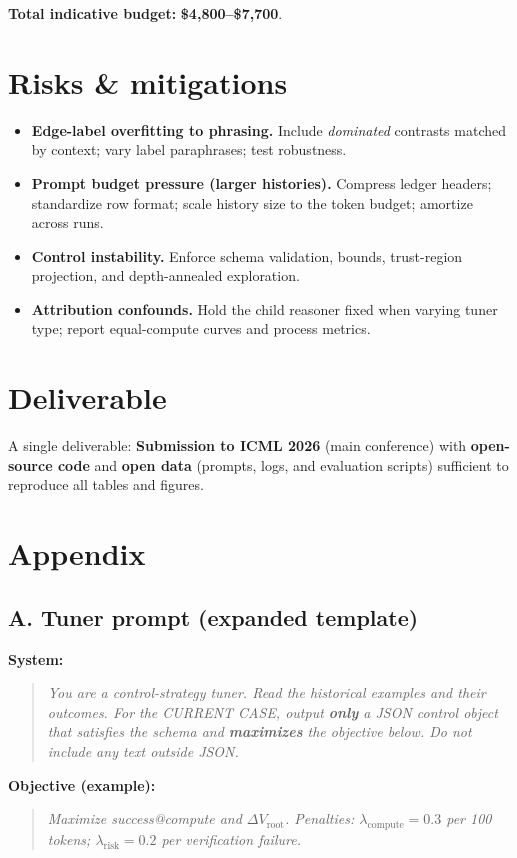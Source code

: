 \documentclass[11pt]{article}
\begin{document}
\noindent\textbf{Total indicative budget:} \textbf{\$4{,}800--\$7{,}700}.

\section{Risks \& mitigations}
\begin{itemize}[leftmargin=1.2em]
  \item \textbf{Edge-label overfitting to phrasing.} Include \emph{dominated} contrasts matched by context; vary label paraphrases; test robustness.
  \item \textbf{Prompt budget pressure (larger histories).} Compress ledger headers; standardize row format; scale history size to the token budget; amortize across runs.
  \item \textbf{Control instability.} Enforce schema validation, bounds, trust-region projection, and depth-annealed exploration.
  \item \textbf{Attribution confounds.} Hold the child reasoner fixed when varying tuner type; report equal-compute curves and process metrics.
\end{itemize}

\section{Deliverable}
A single deliverable: \textbf{Submission to ICML 2026} (main conference) with \textbf{open-source code} and \textbf{open data} (prompts, logs, and evaluation scripts) sufficient to reproduce all tables and figures.

\section*{Appendix}
\subsection*{A. Tuner prompt (expanded template)}
\textbf{System:}
\begin{quote}\itshape
You are a control-strategy tuner. Read the historical examples and their outcomes. For the CURRENT CASE, output \textbf{only} a JSON control object that satisfies the schema and \textbf{maximizes} the objective below. Do not include any text outside JSON.
\end{quote}

\noindent\textbf{Objective (example):}
\begin{quote}\itshape
Maximize success@compute and $\Delta V_{\text{root}}$. Penalties: $\lambda_{\text{compute}}=0.3$ per 100 tokens; $\lambda_{\text{risk}}=0.2$ per verification failure.
\end{quote}
\end{document}

